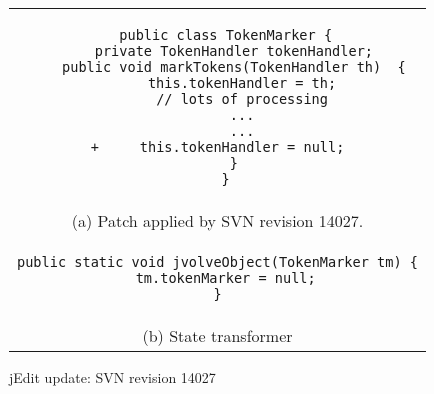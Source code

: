 \begin{figure}[t]
\lstset{frame=single}
\begin{center}
\begin{tabular}{@{}c@{}}
\begin{minipage}{0.78\textwidth}
\begin{lstlisting}
  public class TokenMarker {
    private TokenHandler tokenHandler;
    public void markTokens(TokenHandler th)  {
      this.tokenHandler = th;
      // lots of processing
      ...
      ...
+     this.tokenHandler = null;
    }
  }
\end{lstlisting}
\end{minipage} \\
(a) Patch applied by SVN revision 14027. \\[1ex]
\begin{minipage}{0.78\textwidth}
\begin{lstlisting}
public static void jvolveObject(TokenMarker tm) {
  tm.tokenMarker = null;
}
\end{lstlisting}
\end{minipage} \\
(b) State transformer
\end{tabular}
\caption{jEdit update: SVN revision 14027\label{fig:r14027}}
\end{center}
\lstset{frame=none}
\end{figure}
